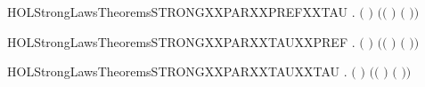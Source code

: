 \newcommand{\HOLStrongLawsTheoremsSTRONGXXPARXXPREFXXSYNCR}{\UseVerbatim{HOLStrongLawsTheoremsSTRONGXXPARXXPREFXXSYNCR}}
\begin{SaveVerbatim}{HOLStrongLawsTheoremsSTRONGXXPARXXPREFXXTAU}
\HOLTokenTurnstile{} \HOLSymConst{\HOLTokenForall{}}  .
        \ensuremath{(}\HOLSymConst{\ensuremath{\ldotp}} \HOLSymConst{\ensuremath{\mid}} \HOLConst{\ensuremath{\tau}}\HOLSymConst{\ensuremath{\ldotp}}\ensuremath{)} \ensuremath{(}\HOLSymConst{\ensuremath{\ldotp}}\ensuremath{(} \HOLSymConst{\ensuremath{\mid}} \HOLConst{\ensuremath{\tau}}\HOLSymConst{\ensuremath{\ldotp}}\ensuremath{)} \HOLSymConst{\ensuremath{+}} \HOLConst{\ensuremath{\tau}}\HOLSymConst{\ensuremath{\ldotp}}\ensuremath{(}\HOLSymConst{\ensuremath{\ldotp}} \HOLSymConst{\ensuremath{\mid}} \ensuremath{)}\ensuremath{)}
\end{SaveVerbatim}
\newcommand{\HOLStrongLawsTheoremsSTRONGXXPARXXPREFXXTAU}{\UseVerbatim{HOLStrongLawsTheoremsSTRONGXXPARXXPREFXXTAU}}
\begin{SaveVerbatim}{HOLStrongLawsTheoremsSTRONGXXPARXXTAUXXPREF}
\HOLTokenTurnstile{} \HOLSymConst{\HOLTokenForall{}}  .
        \ensuremath{(}\HOLConst{\ensuremath{\tau}}\HOLSymConst{\ensuremath{\ldotp}} \HOLSymConst{\ensuremath{\mid}} \HOLSymConst{\ensuremath{\ldotp}}\ensuremath{)} \ensuremath{(}\HOLConst{\ensuremath{\tau}}\HOLSymConst{\ensuremath{\ldotp}}\ensuremath{(} \HOLSymConst{\ensuremath{\mid}} \HOLSymConst{\ensuremath{\ldotp}}\ensuremath{)} \HOLSymConst{\ensuremath{+}} \HOLSymConst{\ensuremath{\ldotp}}\ensuremath{(}\HOLConst{\ensuremath{\tau}}\HOLSymConst{\ensuremath{\ldotp}} \HOLSymConst{\ensuremath{\mid}} \ensuremath{)}\ensuremath{)}
\end{SaveVerbatim}
\newcommand{\HOLStrongLawsTheoremsSTRONGXXPARXXTAUXXPREF}{\UseVerbatim{HOLStrongLawsTheoremsSTRONGXXPARXXTAUXXPREF}}
\begin{SaveVerbatim}{HOLStrongLawsTheoremsSTRONGXXPARXXTAUXXTAU}
\HOLTokenTurnstile{} \HOLSymConst{\HOLTokenForall{}} .
        \ensuremath{(}\HOLConst{\ensuremath{\tau}}\HOLSymConst{\ensuremath{\ldotp}} \HOLSymConst{\ensuremath{\mid}} \HOLConst{\ensuremath{\tau}}\HOLSymConst{\ensuremath{\ldotp}}\ensuremath{)} \ensuremath{(}\HOLConst{\ensuremath{\tau}}\HOLSymConst{\ensuremath{\ldotp}}\ensuremath{(} \HOLSymConst{\ensuremath{\mid}} \HOLConst{\ensuremath{\tau}}\HOLSymConst{\ensuremath{\ldotp}}\ensuremath{)} \HOLSymConst{\ensuremath{+}} \HOLConst{\ensuremath{\tau}}\HOLSymConst{\ensuremath{\ldotp}}\ensuremath{(}\HOLConst{\ensuremath{\tau}}\HOLSymConst{\ensuremath{\ldotp}} \HOLSymConst{\ensuremath{\mid}} \ensuremath{)}\ensuremath{)}
\end{SaveVerbatim}
